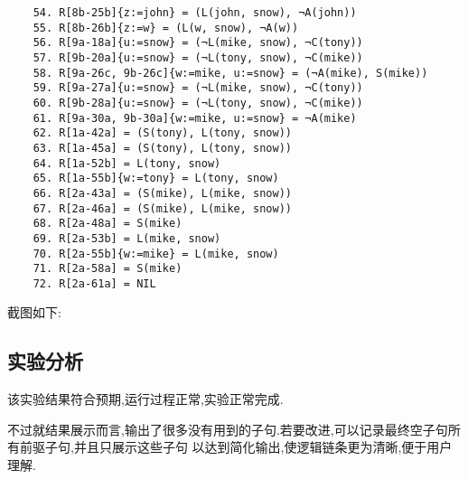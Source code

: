 \begin{verbatim}
    54. R[8b-25b]{z:=john} = (L(john, snow), ¬A(john))
    55. R[8b-26b]{z:=w} = (L(w, snow), ¬A(w))
    56. R[9a-18a]{u:=snow} = (¬L(mike, snow), ¬C(tony))
    57. R[9b-20a]{u:=snow} = (¬L(tony, snow), ¬C(mike))
    58. R[9a-26c, 9b-26c]{w:=mike, u:=snow} = (¬A(mike), S(mike))
    59. R[9a-27a]{u:=snow} = (¬L(mike, snow), ¬C(tony))
    60. R[9b-28a]{u:=snow} = (¬L(tony, snow), ¬C(mike))
    61. R[9a-30a, 9b-30a]{w:=mike, u:=snow} = ¬A(mike)
    62. R[1a-42a] = (S(tony), L(tony, snow))
    63. R[1a-45a] = (S(tony), L(tony, snow))
    64. R[1a-52b] = L(tony, snow)
    65. R[1a-55b]{w:=tony} = L(tony, snow)
    66. R[2a-43a] = (S(mike), L(mike, snow))
    67. R[2a-46a] = (S(mike), L(mike, snow))
    68. R[2a-48a] = S(mike)
    69. R[2a-53b] = L(mike, snow)
    70. R[2a-55b]{w:=mike} = L(mike, snow)
    71. R[2a-58a] = S(mike)
    72. R[2a-61a] = NIL
    \end{verbatim}
    截图如下:
    \subsection{实验分析}
    该实验结果符合预期,运行过程正常,实验正常完成.

    不过就结果展示而言,输出了很多没有用到的子句.若要改进,可以记录最终空子句所有前驱子句,并且只展示这些子句
    以达到简化输出,使逻辑链条更为清晰,便于用户理解.

